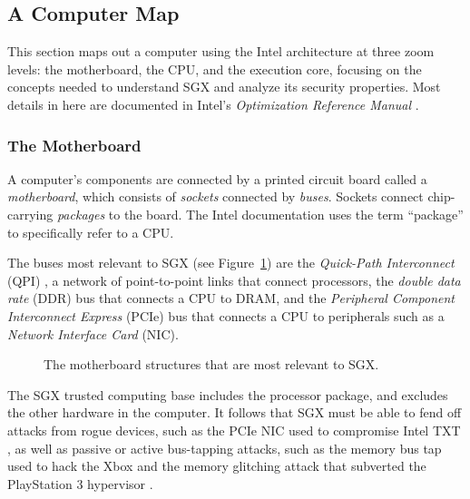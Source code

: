 \subsection{A Computer Map}

This section maps out a computer using the Intel architecture at three zoom
levels: the motherboard, the CPU, and the execution core, focusing on the
concepts needed to understand SGX and analyze its security properties. Most
details in here are documented in Intel's
\textit{Optimization Reference Manual} \cite{intel2014optimization}.


\subsubsection{The Motherboard}
\label{sec:motherboard}

A computer's components are connected by a printed circuit board called a
\textit{motherboard}, which consists of \textit{sockets} connected by
\textit{buses}. Sockets connect chip-carrying \textit{packages} to the board.
The Intel documentation uses the term ``package'' to specifically refer to a
CPU.

The buses most relevant to SGX (see Figure~\ref{fig:motherboard}) are the
\textit{Quick-Path Interconnect} (QPI) \cite{intel2009qpi}, a network of
point-to-point links that connect processors, the \textit{double data rate}
(DDR) bus that connects a CPU to DRAM, and the \textit{Peripheral Component
Interconnect Express} (PCIe) bus that connects a CPU to peripherals such as a
\textit{Network Interface Card} (NIC).

\begin{figure}[hbt]
  \caption{
    The motherboard structures that are most relevant to SGX.
  }
  \label{fig:motherboard}
\end{figure}

The SGX trusted computing base includes the processor package, and excludes the
other hardware in the computer. It follows that SGX must be able to fend off
attacks from rogue devices, such as the PCIe NIC used to compromise Intel TXT
\cite{wojtczuk2011txt}, as well as passive or active bus-tapping attacks, such
as the memory bus tap used to hack the Xbox \cite{huang2003xbox} and the
memory glitching attack that subverted the PlayStation 3 hypervisor
\cite{hotz2010ps3}.


